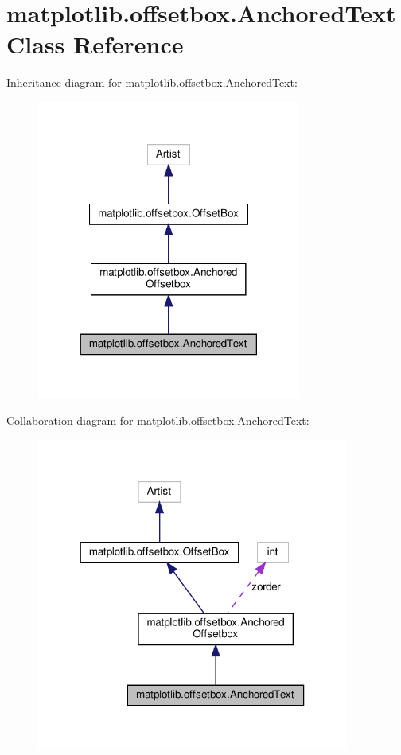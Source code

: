 \hypertarget{classmatplotlib_1_1offsetbox_1_1AnchoredText}{}\section{matplotlib.\+offsetbox.\+Anchored\+Text Class Reference}
\label{classmatplotlib_1_1offsetbox_1_1AnchoredText}


Inheritance diagram for matplotlib.\+offsetbox.\+Anchored\+Text\+:
\nopagebreak
\begin{figure}[H]
\begin{center}
\leavevmode
\includegraphics[width=246pt]{classmatplotlib_1_1offsetbox_1_1AnchoredText__inherit__graph}
\end{center}
\end{figure}


Collaboration diagram for matplotlib.\+offsetbox.\+Anchored\+Text\+:
\nopagebreak
\begin{figure}[H]
\begin{center}
\leavevmode
\includegraphics[width=291pt]{classmatplotlib_1_1offsetbox_1_1AnchoredText__coll__graph}
\end{center}
\end{figure}
